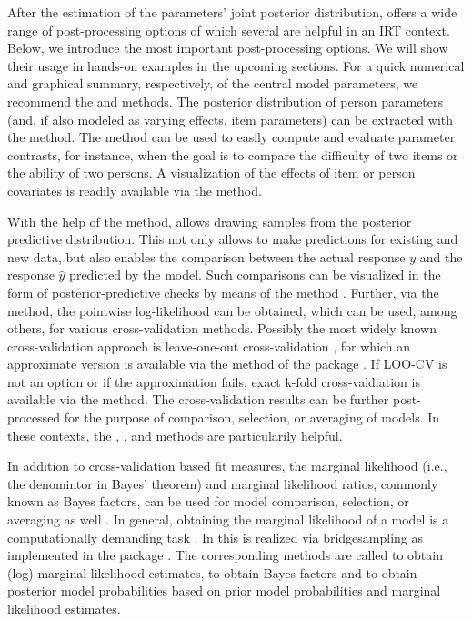 \documentclass[article]{jss}
\begin{document}
After the estimation of the parameters' joint posterior distribution,
 offers a wide range of post-processing options of which
several are helpful in an IRT context. Below, we introduce the most
important post-processing options. We will show their usage in hands-on
examples in the upcoming sections. For a quick numerical and graphical
summary, respectively, of the central model parameters, we recommend the
 and  methods. The posterior distribution of
person parameters (and, if also modeled as varying effects, item
parameters) can be extracted with the  method. The
 method can be used to easily compute and evaluate
parameter contrasts, for instance, when the goal is to compare the
difficulty of two items or the ability of two persons. A visualization
of the effects of item or person covariates is readily available via the
 method.

With the help of the  method,  allows
drawing samples from the posterior predictive distribution. This not
only allows to make predictions for existing and new data, but also
enables the comparison between the actual response \(y\) and the
response \(\hat{y}\) predicted by the model. Such comparisons can be
visualized in the form of posterior-predictive checks by means of the
 method \citep{gabry2019}. Further, via the
 method, the pointwise log-likelihood can be obtained,
which can be used, among others, for various cross-validation methods.
Possibly the most widely known cross-validation approach is
leave-one-out cross-validation \citep[LOO-CV;][]{vehtari2017loo}, for
which an approximate version is available via the  method of
the  package \citep{vehtari2017loo, vehtari2017psis}. If LOO-CV
is not an option or if the approximation fails, exact k-fold
cross-valdiation is available via the  method. The
cross-validation results can be further post-processed for the purpose
of comparison, selection, or averaging of models. In these contexts, the
, , and  methods
are particularily helpful.

In addition to cross-validation based fit measures, the marginal
likelihood (i.e., the denomintor in Bayes' theorem) and marginal
likelihood ratios, commonly known as Bayes factors, can be used for
model comparison, selection, or averaging as well \citep{kass1995}. In
general, obtaining the marginal likelihood of a model is a
computationally demanding task \citep{kass1995}. In  this is
realized via bridgesampling \citep{meng1996, meng2002} as implemented in
the  package \citep{bridgesampling}. The
corresponding methods are called  to obtain (log)
marginal likelihood estimates,  to obtain Bayes
factors and  to obtain posterior model probabilities
based on prior model probabilities and marginal likelihood estimates.
\end{document}
